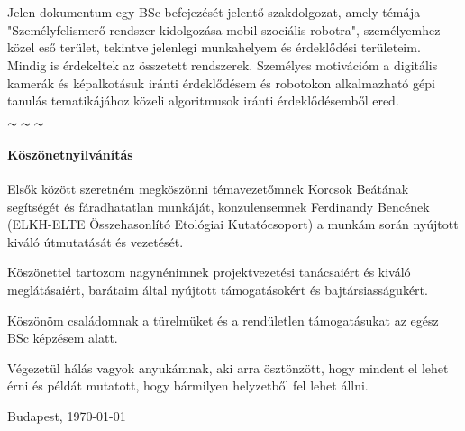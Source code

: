 \chapter*{\eloszo}
Jelen dokumentum egy BSc befejezését jelentő szakdolgozat, amely témája "Személyfelismerő rendszer kidolgozása mobil szociális robotra", személyemhez közel eső terület, tekintve jelenlegi munkahelyem és érdeklődési területeim. Mindig is érdekeltek az összetett rendszerek. Személyes motivációm a digitális kamerák és képalkotásuk iránti érdeklődésem és robotokon alkalmazható gépi tanulás tematikájához közeli algoritmusok iránti érdeklődésemből ered. 


\begin{center}
    $\thicksim \; \thicksim \; \thicksim$
\end{center}


\subsubsection*{Köszönetnyilvánítás}
Elsők között szeretném megköszönni témavezetőmnek Korcsok Beátának segítségét és fáradhatatlan munkáját, konzulensemnek Ferdinandy Bencének (ELKH-ELTE Összehasonlító Etológiai Kutatócsoport) a munkám során nyújtott kiváló útmutatását és vezetését.

Köszönettel tartozom nagynénimnek projektvezetési tanácsaiért és kiváló meglátásaiért, barátaim által nyújtott támogatásokért és bajtársiasságukért.

Köszönöm családomnak a türelmüket és a rendületlen támogatásukat az egész BSc képzésem alatt.

Végezetül hálás vagyok anyukámnak, aki arra ösztönzött, hogy mindent el lehet érni és példát mutatott, hogy bármilyen helyzetből fel lehet állni.


\vspace{0.5cm}

\begin{flushleft}
{Budapest, \today}
\end{flushleft}

\begin{flushright}
\emph{\authorName}
\end{flushright}

\vfill
